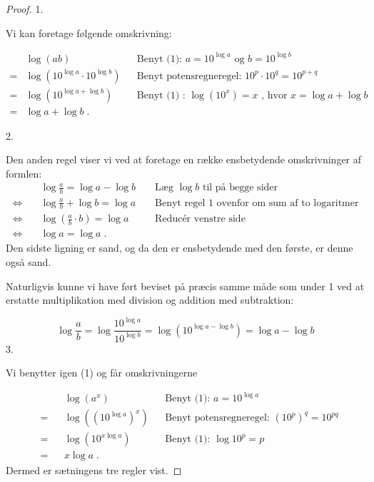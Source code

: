 \documentclass[12pt,oneside,a4paper]{article}
\theoremstyle{plain}
\begin{document}
\begin{proof}

1.

Vi kan foretage følgende omskrivning:

\[
\begin{aligned}
    &\log (ab)& &\text{Benyt (1): } a = 10^{\log a} \text{ og } b = 10^{\log b} \\
    =&\log (10^{\log a} \cdot 10^{\log b}) && \text{Benyt potensregneregel: } 10^p \cdot 10^q = 10^{p + q} \\
    =& \log(10^{\log a + \log b}) &&\text{Benyt (1) : } \log(10^x) = x \text{ , hvor } x = \log a + \log b \\
    =& \log a + \log b \; . 
\end{aligned}
\]

2.

Den anden regel viser vi ved at foretage en række ensbetydende omskrivninger af formlen:
\[
\begin{aligned}
    &\log \frac{a}{b} = \log a - \log b &&\text{ Læg } \log b \text{ til på begge sider } \\ 
    \Leftrightarrow\quad&\log \frac{a}{b} + \log b = \log a &&\text{ Benyt regel 1 ovenfor om sum af to logaritmer} \\ 
    \Leftrightarrow\quad&\log \left( \frac{a}{b} \cdot b \right) = \log a &&\text{ Reducér venstre side } \\ 
    \Leftrightarrow\quad&\log a = \log a \;
. \end{aligned}
\]
Den sidste ligning er sand, og da den er ensbetydende med den første, er denne
også sand.

Naturligvis kunne vi have ført beviset på præcis samme måde som under 1 ved at
erstatte multiplikation med division og addition med subtraktion:

\[
    \log \frac{a}{b} = \log \frac{10^{\log a}}{10^{\log b}} = \log (10^{\log a - \log b}) = \log a - \log b
\]
3.

Vi benytter igen (1) og får omskrivningerne

\[
\begin{aligned}
    &&&\log (a^x) &&\text{Benyt (1): } a = 10^{\log a} \\
    &= &&\log ({(10^{\log a})}^x) &&\text{Benyt potensregneregel: } (10^p)^q = 10^ {pq} \\
    &= &&\log (10^{x \log a}) &&\text{Benyt (1): } \log 10^p = p \\
    &= &&x \log a \; .
\end{aligned}
\]
Dermed er sætningens tre regler vist.
\end{proof}
\end{document}
